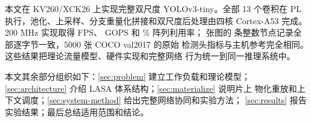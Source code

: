本文在 KV260/XCK26 上实现完整双尺度 YOLOv3-tiny。全部 13 个卷积在 PL
执行，池化、上采样、分支重量化拼接和双尺度后处理由四核 Cortex-A53 完成。
200 MHz 实现取得 \ResidentFPS{} FPS、\PLEffectiveGOPS{} GOPS 和
\ArrayUtilization{}\% 阵列利用率；\ConformanceImages{} 张图的
\NodeRecords{} 条整数节点记录全部逐字节一致，5000 张 COCO val2017 的原始
检测头指标与主机参考完全相同。这些结果把理论流量模型、硬件实现和完整网络
行为统一到同一推理系统中。

本文其余部分组织如下：\cref{sec:problem} 建立工作负载和理论模型；
\cref{sec:architecture} 介绍 LASA 体系结构；\cref{sec:materialize} 说明片上
物化重放和上下文调度；\cref{sec:system-method} 给出完整网络协同和实验方法；
\cref{sec:results} 报告实验结果；最后总结适用范围和结论。
